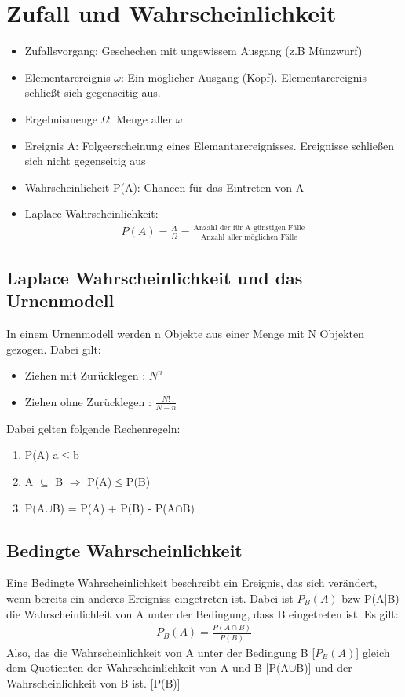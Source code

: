 \documentclass[a4paper,10pt]{scrartcl}
\begin{document}
\section{Zufall und Wahrscheinlichkeit}
\begin{itemize}
    \item Zufallsvorgang: Geschechen mit ungewissem Ausgang (z.B Münzwurf)
    \item Elementarereignis $\omega$: Ein möglicher Ausgang (Kopf). Elementarereignis schließt sich gegenseitig aus.
    \item Ergebnismenge $\Omega$: Menge aller $\omega$
    \item Ereignis A: Folgeerscheinung eines Elemantarereignisses. Ereignisse schließen sich nicht gegenseitig aus
    \item Wahrscheinlicheit P(A): Chancen für das Eintreten von A
    \item Laplace-Wahrscheinlichkeit:
    \begin{align*}
    P(A) = \frac{A}{\Omega} = 
    \frac{\text{Anzahl der für A günstigen Fälle}}{\text{Anzahl aller möglichen Fälle}}
    \end{align*}
\end{itemize}
\subsection{Laplace Wahrscheinlichkeit und das Urnenmodell}
In einem Urnenmodell werden n Objekte aus einer Menge mit N Objekten gezogen. Dabei gilt:
\begin{itemize}
    \item Ziehen mit Zurücklegen : $N^n$
    \item Ziehen ohne Zurücklegen : $\frac{N!}{N-n}$
\end{itemize}
Dabei gelten folgende Rechenregeln:
\begin{enumerate}
    \item P(A) a$\leq$b
    \item A $\subseteq$ B $\Rightarrow$ P(A)$\leq$P(B)
    \item P(A$\cup$B) = P(A) + P(B) - P(A$\cap$B)
\end{enumerate}
\subsection{Bedingte Wahrscheinlichkeit}
Eine Bedingte Wahrscheinlichkeit beschreibt ein Ereignis, das sich verändert, wenn bereits ein anderes Ereigniss eingetreten ist. Dabei ist $P_B(A)$ bzw P(A|B) die Wahrscheinlichleit von A unter der Bedingung, dass B eingetreten ist. Es gilt:
\begin{eqnarray}
P_B(A) = \frac{P(A \cap B)}{P(B)}
\end{eqnarray}
Also, das die Wahrscheinlichkeit von A unter der Bedingung B [$P_B(A)$] gleich dem Quotienten der Wahrscheinlichkeit von A und B [P(A$\cup$B)] und der Wahrscheinlichkeit von B ist. [P(B)]
\end{document}
